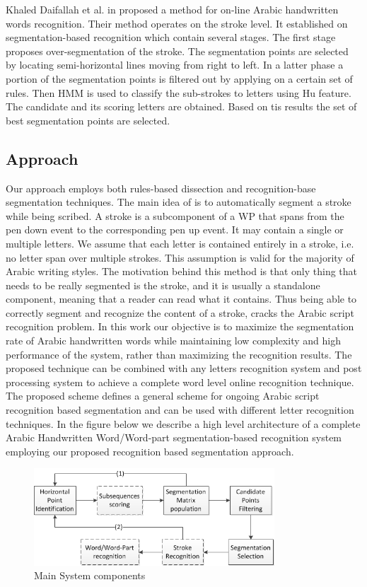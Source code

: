 \documentclass[12pt,journal,compsoc]{IEEEtran}
\begin{document}
Khaled Daifallah et al. in \cite{daifallah2009recognition} proposed a method for on-line Arabic handwritten words recognition. Their method operates on the stroke level. It established on segmentation-based recognition which contain several stages. The first stage proposes over-segmentation of the stroke. The segmentation points are selected by locating semi-horizontal lines moving from right to left. In a latter phase a portion of the segmentation points is filtered out by applying on a certain set of rules. Then HMM is used to classify the sub-strokes to letters using Hu feature. The candidate and its scoring letters are obtained. Based on tis results the set of best segmentation points are selected.   


\subsection{Approach}
Our approach employs both rules-based dissection and recognition-base segmentation techniques. The main idea of is to automatically segment a stroke while being scribed. A stroke is a subcomponent of a WP that spans from the pen down event to the corresponding pen up event. It may contain a single or multiple letters. We assume that each letter is contained entirely in a stroke, i.e. no letter span over multiple strokes. This assumption is valid for the majority of Arabic writing styles. The motivation behind this method is that only thing that needs to be really segmented is the stroke, and it is usually a standalone component, meaning that a reader can read what it contains. Thus being able to correctly segment and recognize the content of a stroke, cracks the Arabic script recognition problem. In this work our objective is to maximize the segmentation rate of Arabic handwritten words while maintaining low complexity and high performance of the system, rather than maximizing the recognition results. 
The proposed technique can be combined with any letters recognition system and post processing system to achieve a complete word level online recognition technique. The proposed scheme defines a general scheme for ongoing Arabic script recognition based segmentation and can be used with different letter recognition techniques. In the figure below we describe a high level architecture of a complete Arabic Handwritten Word/Word-part segmentation-based recognition system employing our proposed recognition based segmentation approach. 
  
\begin{figure}[h]
\centering
\includegraphics[width=9cm]{./figures/main_system_components}
\caption{Main System components}
\label{fig:main_system_components}
\end{figure}
\end{document}

